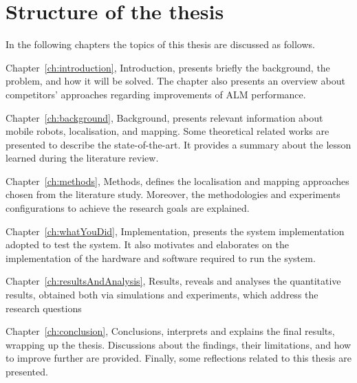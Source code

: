\section{Structure of the thesis}
\noindent In the following chapters the topics of this thesis are discussed as follows.

Chapter~\ref{ch:introduction}, Introduction, presents briefly the background, the problem, and how it will be solved.
The chapter also presents an overview about competitors' approaches regarding improvements of \gls{ALM} performance.

Chapter~\ref{ch:background}, Background, presents relevant information about mobile robots, localisation, and mapping.
Some theoretical related works are presented to describe the state-of-the-art.
It provides a summary about the lesson learned during the literature review.

Chapter~\ref{ch:methods}, Methods, defines the localisation and mapping approaches chosen from the literature study.
Moreover, the methodologies and experiments configurations to achieve the research goals are explained.

Chapter~\ref{ch:whatYouDid}, Implementation, presents the system implementation adopted to test the system.
It also motivates and elaborates on the implementation of the hardware and software required to run the system.

Chapter~\ref{ch:resultsAndAnalysis}, Results, reveals and analyses the quantitative results, obtained both via simulations and experiments, which address the research questions

Chapter~\ref{ch:conclusion}, Conclusions, interprets and explains the final results, wrapping up the thesis.
Discussions about the findings, their limitations, and how to improve further are provided.
Finally, some reflections related to this thesis are presented.


\cleardoublepage
